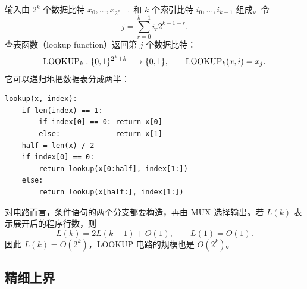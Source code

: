 \begin{example}[LOOKUP]
  \label{ex:lookup-circuit}
  输入由 $2^k$ 个数据比特
  $x_0,\ldots,x_{2^k-1}$ 和 $k$ 个索引比特
  $i_0,\ldots,i_{k-1}$ 组成。令
  \[
    j=\sum_{r=0}^{k-1}i_r2^{k-1-r}.
  \]
  查表函数（lookup function）返回第 $j$ 个数据比特：
  \[
    \operatorname{LOOKUP}_k:
    \{0,1\}^{2^k+k}\longrightarrow\{0,1\},
    \qquad
    \operatorname{LOOKUP}_k(x,i)=x_j.
  \]
  它可以递归地把数据表分成两半：
\begin{verbatim}
lookup(x, index):
    if len(index) == 1:
        if index[0] == 0: return x[0]
        else:             return x[1]
    half = len(x) / 2
    if index[0] == 0:
        return lookup(x[0:half], index[1:])
    else:
        return lookup(x[half:], index[1:])
\end{verbatim}
  对电路而言，条件语句的两个分支都要构造，再由 MUX 选择输出。若
  $L(k)$ 表示展开后的程序行数，则
  \[
    L(k)=2L(k-1)+O(1),
    \qquad
    L(1)=O(1).
  \]
  因此 $L(k)=O(2^k)$，LOOKUP 电路的规模也是 $O(2^k)$。
\end{example}

\lecture
\label{lec:boolean-circuits-continuation}

\subsection{精细上界}

